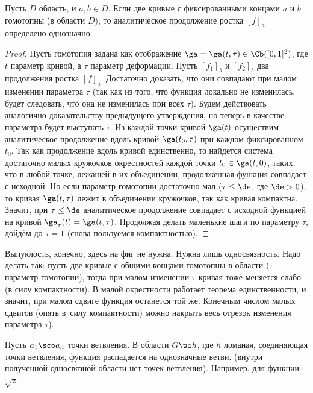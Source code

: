 \documentclass[a4paper]{article}
\begin{document}
\begin{theorem}
\begin{petit}
\begin{theorem}[о монодромии]
Пусть $D$ область, и $a,b\in D$. Если две кривые с фиксированными концами $a$ и $b$ гомотопны (в области $D$),
то аналитическое продолжение ростка $[f]_a$ определено однозначно.
\end{theorem}
\begin{proof}
Пусть гомотопия задана как отображение $\ga=\ga(t,\tau) \in \Cb([0,1]^2)$, где $t$ параметр кривой, а $\tau$ параметр
деформации. Пусть $[f_1]_b$ и $[f_2]_b$ два продолжения ростка $[f]_a$. Достаточно доказать, что они совпадают при
малом изменении параметра $\tau$ (так как из того, что функция локально не изменилась, будет следовать, что она не изменилась
при всех $\tau$). Будем действовать аналогично доказательству предыдущего утверждения, но теперь в качестве
параметра будет выступать $\tau$. Из каждой точки кривой $\ga(t)$ осуществим аналитическое продолжение вдоль кривой $\ga(t_0,\tau)$
при каждом фиксированном $t_0$. Так как продолжение вдоль кривой единственно, то найдётся система достаточно малых кружочков
окрестностей каждой точки $t_0\in\ga(t,0)$, таких, что в любой точке, лежащей в их объединении, продолженная функция совпадает
с исходной. Но если параметр гомотопии достаточно мал ($\tau \le \de$, где $\de>0$), то кривая $\ga(t,\tau)$ лежит в объединении
кружочков, так как кривая компактна. Значит, при $\tau\le\de$ аналитическое продолжение совпадает с исходной функцией
на кривой $\ga_\tau(t)= \ga(t,\tau)$. Продолжая делать маленькие шаги по параметру $\tau$, дойдём до $\tau=1$
(снова пользуемся компактностью).
\end{proof}


Выпуклость, конечно, здесь на фиг не нужна. Нужна лишь односвязность. Надо делать так: пусть две кривые с
общими концами гомотопны в области ($\tau$ параметр гомотопии), тогда при малом изменении $\tau$ кривая тоже
меняется слабо (в силу компактности). В малой окрестности работает теорема единственности, и значит, при малом
сдвиге функция останется той же. Конечным числом малых сдвигов (опять в~силу компактности) можно накрыть весь
отрезок изменения параметра $\tau$).
\end{petit}

\begin{ex}
Пусть $a_1\sco a_n$ точки ветвления. В области $G\wo h$, где $h$ ломаная, соединяющая точки ветвления,
функция распадается на однозначные ветви. (внутри полученной односвязной области нет точек ветвления).
Например, для функции $\sqrt{z}$.
\end{ex}


\end{theorem}
\end{document}
